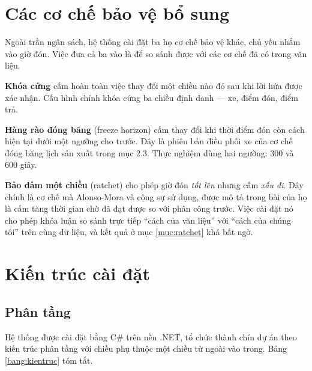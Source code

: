 \section{Các cơ chế bảo vệ bổ sung}

Ngoài trần ngân sách, hệ thống cài đặt ba họ cơ chế bảo vệ khác, chủ yếu nhắm vào giờ đón. Việc
đưa cả ba vào là để so sánh được với các cơ chế đã có trong văn liệu.

\textbf{Khóa cứng} cấm hoàn toàn việc thay đổi một chiều nào đó sau khi lời hứa được xác nhận.
Cấu hình chính khóa cứng ba chiều định danh --- xe, điểm đón, điểm trả.

\textbf{Hàng rào đóng băng} (freeze horizon) cấm thay đổi khi thời điểm đón còn cách hiện tại
dưới một ngưỡng cho trước. Đây là phiên bản điều phối xe của cơ chế đóng băng lịch sản xuất
trong mục 2.3. Thực nghiệm dùng hai ngưỡng: 300 và 600 giây.

\textbf{Bảo đảm một chiều} (ratchet) cho phép giờ đón \emph{tốt lên} nhưng cấm \emph{xấu đi}.
Đây chính là cơ chế mà Alonso-Mora và cộng sự \cite{alonsomora2017} sử dụng, được mô tả trong
bài của họ là cấm tăng thời gian chờ đã đạt được so với phân công trước. Việc cài đặt nó cho
phép khóa luận so sánh trực tiếp ``cách của văn liệu'' với ``cách của chúng tôi'' trên cùng dữ
liệu, và kết quả ở mục \ref{muc:ratchet} khá bất ngờ.

\section{Kiến trúc cài đặt}

\subsection{Phân tầng}

Hệ thống được cài đặt bằng C\# trên nền .NET, tổ chức thành chín dự án theo kiến trúc phân tầng
với chiều phụ thuộc một chiều từ ngoài vào trong. Bảng \ref{bang:kientruc} tóm tắt.

